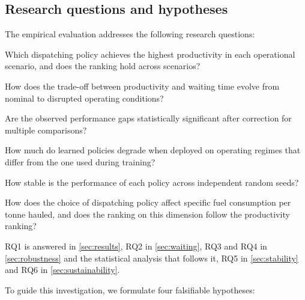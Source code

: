 \documentclass[11pt,a4paper]{article}
\begin{document}
\subsection{Research questions and hypotheses}
\label{sec:rq}

The empirical evaluation addresses the following research questions:

\begin{description}[leftmargin=1.2cm,labelwidth=1.0cm]

  \item[RQ1] Which dispatching policy achieves the highest productivity in each
  operational scenario, and does the ranking hold across scenarios?

  \item[RQ2] How does the trade-off between productivity and waiting time evolve
  from nominal to disrupted operating conditions?

  \item[RQ3] Are the observed performance gaps statistically significant after
  correction for multiple comparisons?

  \item[RQ4] How much do learned policies degrade when deployed on operating
  regimes that differ from the one used during training?

  \item[RQ5] How stable is the performance of each policy across independent
  random seeds?

  \item[RQ6] How does the choice of dispatching policy affect specific fuel
  consumption per tonne hauled, and does the ranking on this dimension follow
  the productivity ranking?

\end{description}

RQ1 is answered in \cref{sec:results}, RQ2 in \cref{sec:waiting}, RQ3 and RQ4 in \cref{sec:robustness} and the statistical analysis that follows it, RQ5 in \cref{sec:stability} and RQ6 in \cref{sec:sustainability}.

To guide this investigation, we formulate four falsifiable hypotheses:
\end{document}
